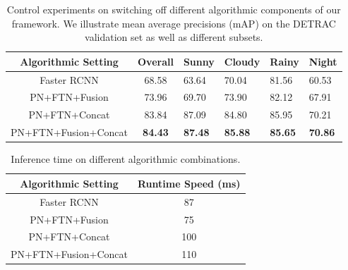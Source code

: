 \documentclass[5pt]{article}
\begin{document}
\begin{table}[t]
\footnotesize
\begin{center}
\begin{tabular}{c|c|P{0.2in}P{0.2in}P{0.2in}P{0.2in}}
\hline
Algorithmic Setting & Overall & Sunny & Cloudy & Rainy & Night \\
\hline
Faster RCNN \cite{renNIPS15fasterrcnn} & 68.58 & 63.64 & 70.04 & 81.56 & 60.53\\
PN+FTN+Fusion & 73.96 & 69.70 & 73.90 & 82.12 & 67.91\\
PN+FTN+Concat & 83.84 & 87.09 & 84.80 & 85.95 & 70.21\\
PN+FTN+Fusion+Concat & \textbf{84.43} & \textbf{87.48} & \textbf{85.88} & \textbf{85.65} & \textbf{70.86}\\
\hline
\end{tabular}
\end{center}
\vspace{-0.1in}
\caption{Control experiments on switching off different algorithmic components of our framework. We illustrate mean average precisions (mAP) on the DETRAC validation set as well as different subsets. }
\vspace{-0.1in}
\label{tb:control}
\end{table}

\begin{table}[t]
\begin{center}
\begin{tabular}{c|c}
\hline
Algorithmic Setting & Runtime Speed (ms) \\
\hline
Faster RCNN \cite{renNIPS15fasterrcnn} & 87\\
PN+FTN+Fusion & 75\\
PN+FTN+Concat & 100\\
PN+FTN+Fusion+Concat & 110\\
\hline
\end{tabular}
\end{center}
\vspace{-0.1in}
\caption{Inference time on different algorithmic combinations. }
\label{tb:speed}
\vspace{-0.1in}
\end{table}
\end{document}
